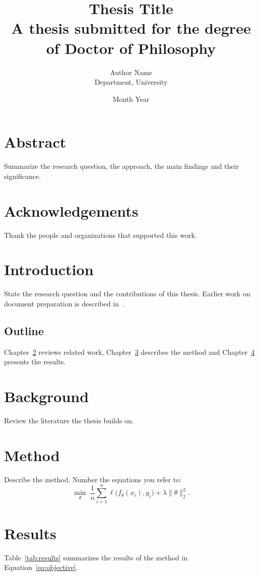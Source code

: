 \documentclass[12pt,a4paper,oneside]{book}
\title{Thesis Title\\[1ex]\large A thesis submitted for the degree of Doctor of Philosophy}
\author{Author Name\\[1ex]\normalsize Department, University}
\date{Month Year}
\begin{document}
\frontmatter
\maketitle

\chapter*{Abstract}
Summarize the research question, the approach, the main findings and their significance.

\chapter*{Acknowledgements}
Thank the people and organizations that supported this work.

\tableofcontents
\listoftables

\mainmatter
\chapter{Introduction}
State the research question and the contributions of this thesis.
Earlier work on document preparation is described in~\cite{lamport1994latex,knuth1984texbook}.

\section{Outline}
Chapter~\ref{ch:background} reviews related work, Chapter~\ref{ch:method} describes the method
and Chapter~\ref{ch:results} presents the results.

\chapter{Background}
\label{ch:background}
Review the literature the thesis builds on.

\chapter{Method}
\label{ch:method}
Describe the method. Number the equations you refer to:
\begin{equation}
  \label{eq:objective}
  \min_{\theta} \; \frac{1}{n} \sum_{i=1}^{n} \ell\bigl(f_\theta(x_i), y_i\bigr) + \lambda \lVert \theta \rVert_2^2 .
\end{equation}

\chapter{Results}
\label{ch:results}
Table~\ref{tab:results} summarizes the results of the method in Equation~\eqref{eq:objective}.
\end{document}
